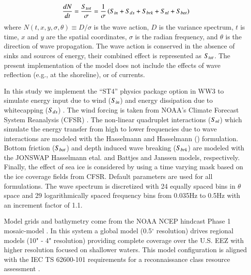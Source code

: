 \begin{align}
  \frac{d N}{d t} = \frac{S_{ tot }}{\sigma} = \frac{1}{\sigma}\left ( S_{ in } + S_{ ds } + S_{ brk } + S_{ nl } + S_{ bot } \right )
  \label{eqn:actionbalance}
\end{align}
where $N(t,x,y,\sigma,\theta) \equiv D/\sigma$ is the wave action, $D$ is the variance spectrum, $t$ is time, $x$ and $y$ are the spatial coordinates, $\sigma$ is the radian frequency, and $\theta$ is the direction of wave propagation.
The wave action is conserved in the absence of sinks and sources of energy, their combined effect is represented as $S_{ tot }$. The present implementation of the model does not include the effects of wave reflection (e.g., at the shoreline), or of currents.

In this study we implement the ``ST4'' physics package option in WW3 to simulate energy input due to wind ($S_{ in }$) and energy dissipation due to whitecapping ($S_{ ds }$) \citep{ardhuinObservationSwellDissipation2009}.
The wind forcing is taken from NOAA's Climate Forecast System Reanalysis (CFSR) \citep{sahaNCEPClimateForecast2010}. The non-linear quadruplet interactions ($S_{ nl }$) which simulate the energy transfer from high to lower frequencies due to wave interactions are modeled with the Hasselmann and Hasselmann (\citeyear{hasselmannComputationsParameterizationsNonlinear1985}) formulation. Bottom friction ($S_{ bot }$) and depth induced wave breaking ($S_{ brk }$) are modeled with the JONSWAP Hasselmann etal. \citeyear{hasselmannMeasurementsWindwaveGrowth1973} and Battjes and Janssen \citeyear{battjesEnergyLossSetup1978} models, respectively. Finally, the effect of sea ice is considered by using a time varying mask based on the ice coverage fields from CFSR. Default parameters are used for all formulations. The wave spectrum is discretized with 24 equally spaced bins in $\theta$ space and 29 logarithmically spaced frequency bins from 0.035Hz to 0.5Hz with an increment factor of 1.1.

Model grids and bathymetry come from the NOAA NCEP hindcast Phase 1 mosaic-model \citep{chawla2011wavewatch,chawla201230,chawla_validation_2013}. In this system a global model (0.5$^{\circ}$ resolution) drives regional models (10" - 4" resolution) providing complete coverage over the U.S. EEZ with higher resolution focused on shallower waters. This model configuration is aligned with the IEC TS 62600-101 requirements for a reconnaissance class resource assessment \citep{internationalelectrotechnicalcommissionPart101Wave2015}.

